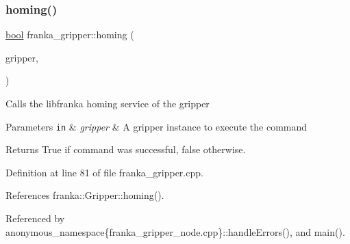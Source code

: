 \subsubsection{\texorpdfstring{homing()}{homing()}}
{\footnotesize\ttfamily \hyperlink{classbool}{bool} franka\+\_\+gripper\+::homing (\begin{DoxyParamCaption}\item[{const \hyperlink{classfranka_1_1Gripper}{franka\+::\+Gripper} \&}]{gripper,  }\item[{const Homing\+Goal\+Const\+Ptr \&}]{ }\end{DoxyParamCaption})}

Calls the libfranka homing service of the gripper


\begin{DoxyParams}[1]{Parameters}
\mbox{\tt in}  & {\em gripper} & A gripper instance to execute the command\\
\hline
\end{DoxyParams}
\begin{DoxyReturn}{Returns}
True if command was successful, false otherwise. 
\end{DoxyReturn}


Definition at line 81 of file franka\+\_\+gripper.\+cpp.



References franka\+::\+Gripper\+::homing().



Referenced by anonymous\+\_\+namespace\{franka\+\_\+gripper\+\_\+node.\+cpp\}\+::handle\+Errors(), and main().


